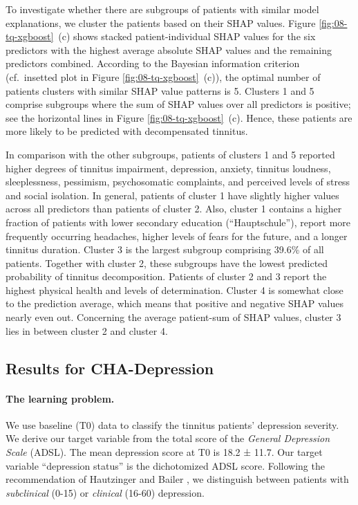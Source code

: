 \documentclass[
  oneside]{book}
\begin{document}
To investigate whether there are subgroups of patients with similar model explanations, we cluster the patients based on their SHAP values.
Figure \ref{fig:08-tq-xgboost}~(c) shows stacked patient-individual SHAP values for the six predictors with the highest average absolute SHAP values and the remaining predictors combined.
According to the Bayesian information criterion (cf.~insetted plot in Figure \ref{fig:08-tq-xgboost}~(c)), the optimal number of patients clusters with similar SHAP value patterns is 5.
Clusters 1 and 5 comprise subgroups where the sum of SHAP values over all predictors is positive; see the horizontal lines in Figure \ref{fig:08-tq-xgboost}~(c).
Hence, these patients are more likely to be predicted with decompensated tinnitus.

In comparison with the other subgroups, patients of clusters 1 and 5 reported higher degrees of tinnitus impairment, depression, anxiety, tinnitus loudness, sleeplessness, pessimism, psychosomatic complaints, and perceived levels of stress and social isolation.
In general, patients of cluster 1 have slightly higher values across all predictors than patients of cluster 2.
Also, cluster 1 contains a higher fraction of patients with lower secondary education (``Hauptschule''), report more frequently occurring headaches, higher levels of fears for the future, and a longer tinnitus duration.
Cluster 3 is the largest subgroup comprising 39.6\% of all patients.
Together with cluster 2, these subgroups have the lowest predicted probability of tinnitus decomposition.
Patients of cluster 2 and 3 report the highest physical health and levels of determination.
Cluster 4 is somewhat close to the prediction average, which means that positive and negative SHAP values nearly even out.
Concerning the average patient-sum of SHAP values, cluster 3 lies in between cluster 2 and cluster 4.

\hypertarget{iml-results-depression}{%
\subsection{Results for CHA-Depression}\label{iml-results-depression}}

\paragraph*{The learning problem.}

We use baseline (T0) data to classify the tinnitus patients' depression severity.
We derive our target variable from the total score of the \emph{General Depression Scale} \autocite{Radloff:adsl1977,Hautzinger:ADSL2003} (ADSL).
The mean depression score at T0 is 18.2 ± 11.7.
Our target variable ``depression status'' is the dichotomized ADSL score.
Following the recommendation of Hautzinger and Bailer \autocite{Hautzinger:ADSL2003}, we distinguish between patients with \emph{subclinical} (0-15) or \emph{clinical} (16-60) depression.
\end{document}
